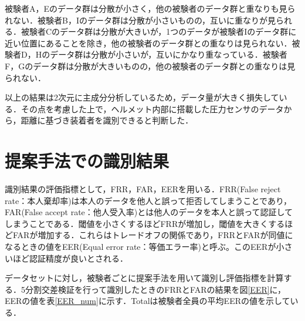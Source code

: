 被験者A，Eのデータ群は分散が小さく，他の被験者のデータ群と重なりも見られない．被験者B，Iのデータ群は分散が小さいものの，互いに重なりが見られる．被験者Cのデータ群は分散が大きいが，1つのデータが被験者Iのデータ群に近い位置にあることを除き，他の被験者のデータ群との重なりは見られない．被験者D，Hのデータ群は分散が小さいが，互いにかなり重なっている．被験者F，Gのデータ群は分散が大きいものの，他の被験者のデータ群との重なりは見られない．\par
以上の結果は2次元に主成分分析しているため，データ量が大きく損失している．その点を考慮した上で，ヘルメット内部に搭載した圧力センサのデータから，距離に基づき装着者を識別できると判断した．

\section{提案手法での識別結果}
識別結果の評価指標として，FRR，FAR，EERを用いる．FRR(False reject rate：本人棄却率)は本人のデータを他人と誤って拒否してしまうことであり，FAR(False accept rate：他人受入率)とは他人のデータを本人と誤って認証してしまうことである．閾値を小さくするほどFRRが増加し，閾値を大きくするほどFARが増加する．これらはトレードオフの関係であり，FRRとFARが同値になるときの値をEER(Equal error rate：等価エラー率)と呼ぶ。このEERが小さいほど認証精度が良いとされる．\par
データセットに対し，被験者ごとに提案手法を用いて識別し評価指標を計算する．5分割交差検証を行って識別したときのFRRとFARの結果を図\ref{EER}に，EERの値を表\ref{EER_num}に示す．Totalは被験者全員の平均EERの値を示している．


